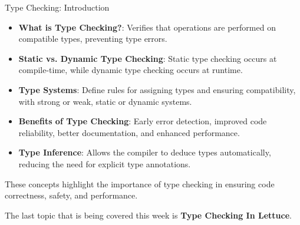 \begin{notes}{Type Checking: Introduction}
\begin{highlight}
        \begin{itemize}
            \item \textbf{What is Type Checking?}: Verifies that operations are performed on compatible types, preventing type errors.
            \item \textbf{Static vs. Dynamic Type Checking}: Static type checking occurs at compile-time, while dynamic type checking occurs at runtime.
            \item \textbf{Type Systems}: Define rules for assigning types and ensuring compatibility, with strong or weak, static or dynamic systems.
            \item \textbf{Benefits of Type Checking}: Early error detection, improved code reliability, better documentation, and enhanced performance.
            \item \textbf{Type Inference}: Allows the compiler to deduce types automatically, reducing the need for explicit type annotations.
        \end{itemize}
    
        These concepts highlight the importance of type checking in ensuring code correctness, safety, and performance.
    
    \end{highlight}
\end{notes}

The last topic that is being covered this week is \textbf{Type Checking In Lettuce}.


